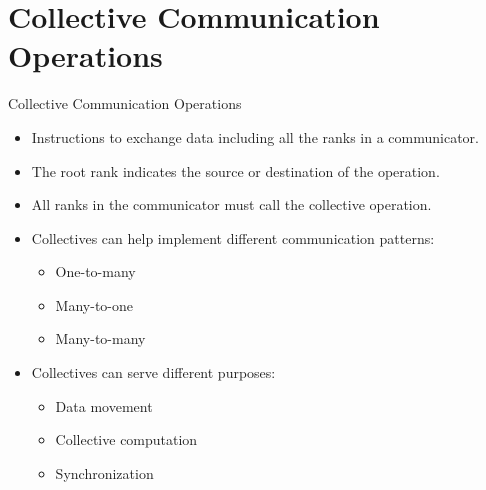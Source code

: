 
\section{Collective Communication Operations}
\begin{frame}[fragile]{Collective Communication Operations}
    \begin{itemize}
        \item Instructions to exchange data including all the ranks in a communicator.
        \vspace{2mm}
          \item The root rank indicates the source or destination of the operation.
        \vspace{2mm}
        \item All ranks in the communicator must call the collective operation. 
         \vspace{2mm}
        \item Collectives can help implement different communication patterns:
            \begin{itemize}
            \item One-to-many
            \item Many-to-one
            \item Many-to-many
            \end{itemize}
        \item Collectives can serve different purposes:
            \begin{itemize}
            \item Data movement
            \item Collective computation
            \item Synchronization
            \end{itemize}
    \end{itemize}

\end{frame}


